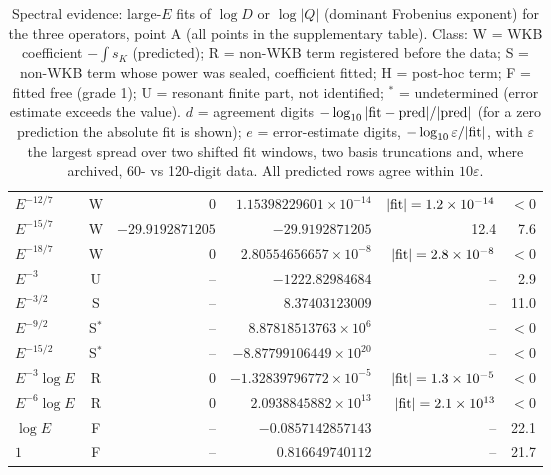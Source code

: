 \begin{table}[p]
\begin{tabular}{@{}l c r r r r@{}}
$E^{-12/7}$ & W & $0$ & $1.15398229601\times10^{-14}$ & $|{\rm fit}|=1.2\times10^{-14}$ & $<0$ \\
$E^{-15/7}$ & W & $-29.9192871205$ & $-29.9192871205$ & 12.4 & 7.6 \\
$E^{-18/7}$ & W & $0$ & $2.80554656657\times10^{-8}$ & $|{\rm fit}|=2.8\times10^{-8}$ & $<0$ \\
$E^{-3}$ & U & -- & $-1222.82984684$ & -- & 2.9 \\
$E^{-3/2}$ & S & -- & $8.37403123009$ & -- & 11.0 \\
$E^{-9/2}$ & S$^\ast$ & -- & $8.87818513763\times10^{6}$ & -- & $<0$ \\
$E^{-15/2}$ & S$^\ast$ & -- & $-8.87799106449\times10^{20}$ & -- & $<0$ \\
$E^{-3}\log E$ & R & $0$ & $-1.32839796772\times10^{-5}$ & $|{\rm fit}|=1.3\times10^{-5}$ & $<0$ \\
$E^{-6}\log E$ & R & $0$ & $2.0938845882\times10^{13}$ & $|{\rm fit}|=2.1\times10^{13}$ & $<0$ \\
$\log E$ & F & -- & $-0.0857142857143$ & -- & 22.1 \\
$1$ & F & -- & $0.816649740112$ & -- & 21.7 \\
\bottomrule
\end{tabular}
\caption{Spectral evidence: large-$E$ fits of $\log D$ or $\log|Q|$ (dominant Frobenius exponent) for the three operators, point A (all points in the supplementary table). Class: W = WKB coefficient $-\int s_K$ (predicted); R = non-WKB term registered before the data; S = non-WKB term whose power was sealed, coefficient fitted; H = post-hoc term; F = fitted free (grade 1); U = resonant finite part, not identified; $^\ast$ = undetermined (error estimate exceeds the value). $d$ = agreement digits $-\log_{10}|{\rm fit}-{\rm pred}|/|{\rm pred}|$ (for a zero prediction the absolute fit is shown); $e$ = error-estimate digits, $-\log_{10}\varepsilon/|{\rm fit}|$, with $\varepsilon$ the largest spread over two shifted fit windows, two basis truncations and, where archived, 60- vs 120-digit data. All predicted rows agree within $10\varepsilon$.}
\label{tab:spectral-evidence}
\end{table}
